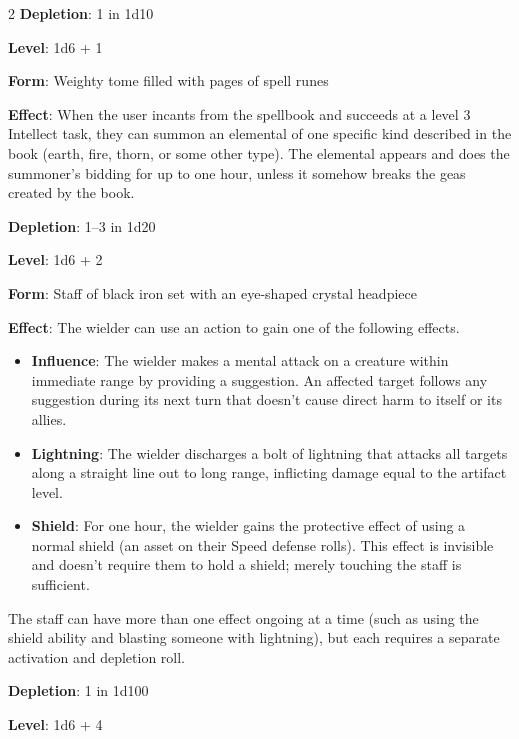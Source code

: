 \begin{multicols}{2}
\textbf{Depletion}: 1 in 1d10 


\textbf{Level}: 1d6 + 1 

\textbf{Form}: Weighty tome filled with pages of spell runes 

\textbf{Effect}: When the user incants from the spellbook and succeeds at a level 3 Intellect task, they can summon an elemental of one specific kind described in the book (earth, fire, thorn, or some other type). The elemental appears and does the summoner’s bidding for up to one hour, unless it somehow breaks the geas created by the book. 

\textbf{Depletion}: 1–3 in 1d20


\textbf{Level}: 1d6 + 2 

\textbf{Form}: Staff of black iron set with an eye-shaped crystal headpiece 

\textbf{Effect}: The wielder can use an action to gain one of the following effects. 

\begin{itemize}
\item \textbf{Influence}: The wielder makes a mental attack on a creature within immediate range by providing a suggestion. An affected target follows any suggestion during its next turn that doesn’t cause direct harm to itself or its allies. 

\item \textbf{Lightning}: The wielder discharges a bolt of lightning that attacks all targets along a straight line out to long range, inflicting damage equal to the artifact level. 

\item \textbf{Shield}: For one hour, the wielder gains the protective effect of using a normal shield (an asset on their Speed defense rolls). This effect is invisible and doesn’t require them to hold a shield; merely touching the staff is sufficient. 
\end{itemize}

The staff can have more than one effect ongoing at a time (such as using the shield ability and blasting someone with lightning), but each requires a separate activation and depletion roll.

\textbf{Depletion}: 1 in 1d100 


\textbf{Level}: 1d6 + 4 


\end{multicols}
